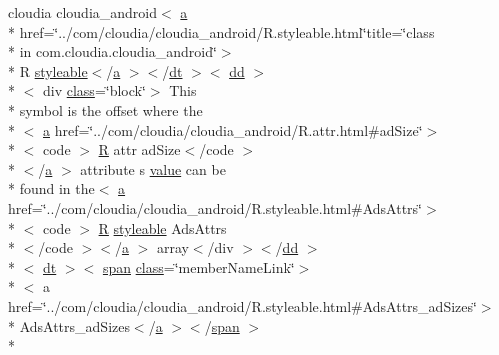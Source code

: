 \begin{DoxyCompactItemize}
cloudia cloudia\-\_\-android$<$ \hyperlink{style_8css_a5e8981582017bb8b84c21f148345d1f7}{a} \\*
href=\char`\"{}../com/cloudia/cloudia\-\_\-android/R.\-styleable.\-html\char`\"{}title=\char`\"{}class \\*
in com.\-cloudia.\-cloudia\-\_\-android\char`\"{}$>$\\*
 R \hyperlink{index-17_8html_ae6c9bf1e41380184b4b665ca9ab6ba0a}{styleable}$<$/\hyperlink{style_8css_a5e8981582017bb8b84c21f148345d1f7}{a} $>$$<$/\hyperlink{stylesheet_8css_a107565fb4039d33b041380d6e0ea1d80}{dt} $>$$<$ \hyperlink{stylesheet_8css_a47f4718a86835a7771ec592ece845221}{dd} $>$\\*
$<$ div \hyperlink{_tools_8html_acf06f836132665ba8114f5a414c2403f}{class}=\char`\"{}block\char`\"{}$>$ This \\*
symbol is the offset where the\\*
$<$ \hyperlink{style_8css_a5e8981582017bb8b84c21f148345d1f7}{a} href=\char`\"{}../com/cloudia/cloudia\-\_\-android/R.\-attr.\-html\#ad\-Size\char`\"{}$>$\\*
$<$ code $>$ \hyperlink{index-16_8html_a31e8fe59be5c20ce90a0090e28a0c1fe}{R} attr ad\-Size$<$/code $>$\\*
$<$/\hyperlink{style_8css_a5e8981582017bb8b84c21f148345d1f7}{a} $>$ attribute s \hyperlink{_my_s_q_l_connector_8measure_8html_afcc7a4b78ecd8fa7e713f8cfa0f51017}{value} can be \\*
found in the$<$ \hyperlink{style_8css_a5e8981582017bb8b84c21f148345d1f7}{a} href=\char`\"{}../com/cloudia/cloudia\-\_\-android/R.\-styleable.\-html\#Ads\-Attrs\char`\"{}$>$\\*
$<$ code $>$ \hyperlink{index-16_8html_a31e8fe59be5c20ce90a0090e28a0c1fe}{R} \hyperlink{index-17_8html_ae6c9bf1e41380184b4b665ca9ab6ba0a}{styleable} Ads\-Attrs\\*
$<$/code $>$$<$/\hyperlink{style_8css_a5e8981582017bb8b84c21f148345d1f7}{a} $>$ array$<$/div $>$$<$/\hyperlink{stylesheet_8css_a47f4718a86835a7771ec592ece845221}{dd} $>$\\*
$<$ \hyperlink{stylesheet_8css_a107565fb4039d33b041380d6e0ea1d80}{dt} $>$$<$ \hyperlink{stylesheet_8css_a8343996ebcf16220b04e54659aac31cc}{span} \hyperlink{_tools_8html_acf06f836132665ba8114f5a414c2403f}{class}=\char`\"{}member\-Name\-Link\char`\"{}$>$\\*
$<$ a href=\char`\"{}../com/cloudia/cloudia\-\_\-android/R.\-styleable.\-html\#Ads\-Attrs\-\_\-ad\-Sizes\char`\"{}$>$\\*
 Ads\-Attrs\-\_\-ad\-Sizes$<$/\hyperlink{style_8css_a5e8981582017bb8b84c21f148345d1f7}{a} $>$$<$/\hyperlink{stylesheet_8css_a8343996ebcf16220b04e54659aac31cc}{span} $>$\\*

\end{DoxyCompactItemize}
